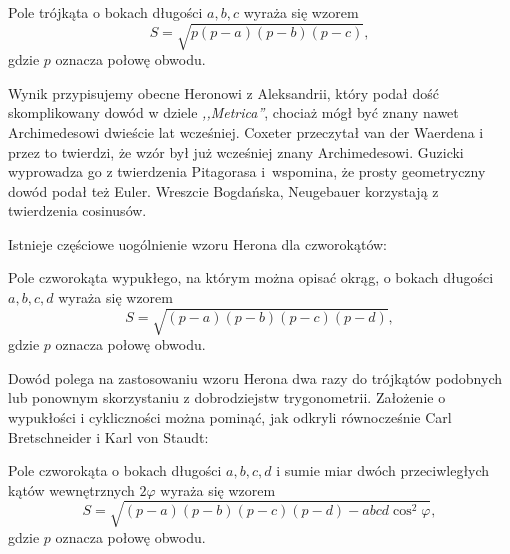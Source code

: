 %


\begin{proposition}
    Pole trójkąta o bokach długości $a, b, c$ wyraża się wzorem
    \begin{equation}
        S = \sqrt{p(p-a)(p-b)(p-c)},
    \end{equation}
    gdzie $p$ oznacza połowę obwodu.
\end{proposition}

Wynik przypisujemy obecne Heronowi z Aleksandrii, który podał dość skomplikowany dowód w dziele \emph{,,Metrica''}, chociaż mógł być znany nawet Archimedesowi dwieście lat wcześniej.
%
Coxeter \cite[s. 12]{coxeter_1991} przeczytał van der Waerdena \cite[s. 228, 277]{waerden_1961} i przez to twierdzi, że wzór był już wcześniej znany Archimedesowi.
%
Guzicki \cite[s. 165-169]{guzicki_2021} wyprowadza go z twierdzenia Pitagorasa i~wspomina, że prosty geometryczny dowód podał też Euler.
%
Wreszcie Bogdańska, Neugebauer \cite[s. 92]{neugebauer_2018} korzystają z twierdzenia cosinusów.

Istnieje częściowe uogólnienie wzoru Herona dla czworokątów:

\begin{proposition}
    \label{brahmagupta_formula}
    Pole czworokąta wypukłego, na którym można opisać okrąg, o bokach długości $a, b, c, d$ wyraża się wzorem
    \begin{equation}
        S = \sqrt{(p-a)(p-b)(p-c)(p-d)},
    \end{equation}
    gdzie $p$ oznacza połowę obwodu.
\end{proposition}

Dowód polega na zastosowaniu wzoru Herona dwa razy do trójkątów podobnych lub ponownym skorzystaniu z dobrodziejstw trygonometrii.
Założenie o wypukłości i cykliczności można pominąć, jak odkryli równocześnie Carl Bretschneider i Karl von Staudt:
%
%

\begin{proposition}
    Pole czworokąta o bokach długości $a, b, c, d$ i sumie miar dwóch przeciwległych kątów wewnętrznych $2 \varphi$ wyraża się wzorem
    \begin{equation}
        S = \sqrt{(p-a)(p-b)(p-c)(p-d) - abcd \cos^2  \varphi},
    \end{equation}
    gdzie $p$ oznacza połowę obwodu.
\end{proposition}

